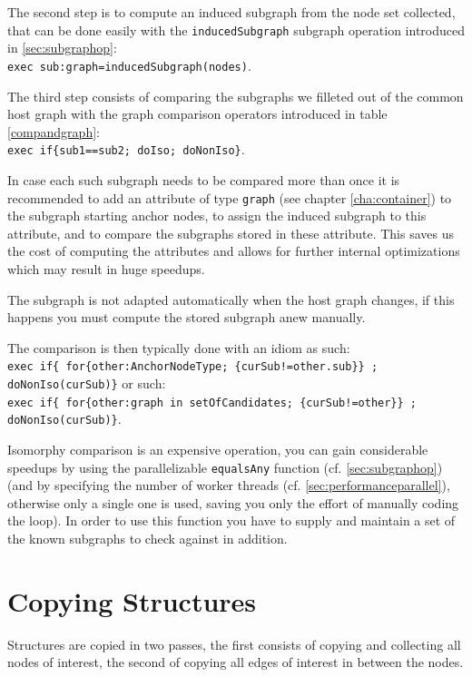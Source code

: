 The second step is to compute an induced subgraph from the node set collected, that can be done easily with the \texttt{inducedSubgraph} subgraph operation introduced in \ref{sec:subgraphop}:\\ \verb#exec sub:graph=inducedSubgraph(nodes)#.

The third step consists of comparing the subgraphs we filleted out of the common host graph with the graph comparison operators introduced in table \ref{compandgraph}:\\
\verb#exec if{sub1==sub2; doIso; doNonIso}#.

In case each such subgraph needs to be compared more than once it is recommended to add an attribute of type \texttt{graph} (see chapter \ref{cha:container}) to the subgraph starting anchor nodes, to assign the induced subgraph to this attribute, and to compare the subgraphs stored in these attribute.
This saves us the cost of computing the attributes and allows for further internal optimizations which 
may result in huge speedups.

\begin{warning}
The subgraph is not adapted automatically when the host graph changes, if this happens you must compute the stored subgraph anew manually.
\end{warning}

\noindent The comparison is then typically done with an idiom as such:\\
\verb#exec if{ for{other:AnchorNodeType; {curSub!=other.sub}} ; doNonIso(curSub)}# 
or such:\\
\verb#exec if{ for{other:graph in setOfCandidates; {curSub!=other}} ; doNonIso(curSub)}#.

Isomorphy comparison is an expensive operation, you can gain considerable speedups by using the parallelizable \texttt{equalsAny} function (cf. \ref{sec:subgraphop}) (and by specifying the number of worker threads (cf. \ref{sec:performanceparallel}), otherwise only a single one is used, saving you only the effort of manually coding the loop). 
In order to use this function you have to supply and maintain a set of the known subgraphs to check against in addition. 

\section{Copying Structures}\label{subsub:copystructure}
Structures are copied in two passes, the first consists of copying and collecting all nodes of interest, the second of copying all edges of interest in between the nodes.


